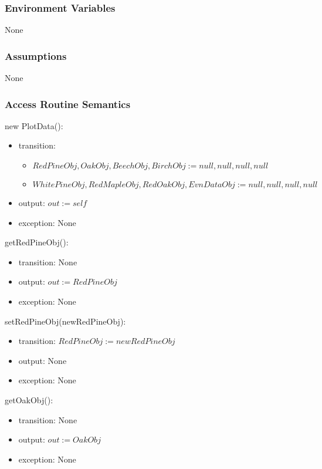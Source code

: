 \documentclass[12pt, titlepage]{article}
\begin{document}
\subsubsection{Environment Variables}
None

\subsubsection{Assumptions}
None

\subsubsection{Access Routine Semantics}

\noindent new PlotData():
\begin{itemize}
\item transition: 
\begin{itemize}
\item $\mathit{RedPineObj, OakObj, BeechObj, 
BirchObj := null, null, null, null}$

\item $\mathit{WhitePineObj, RedMapleObj, RedOakObj, EvnDataObj
:= null, null, null, null}$
\end{itemize}

\item output: $\mathit{out := self}$
\item exception: None 
\end{itemize}


\renewcommand{\attr}{RedPineObj}
\noindent get\attr():
\begin{itemize}
\item transition: None
\item output: $\mathit{out := \attr}$
\item exception: None
\end{itemize}

\noindent set\attr(new\attr):
\begin{itemize}
\item transition: $\mathit{\attr := new\attr}$
\item output: None
\item exception: None
\end{itemize}


\renewcommand{\attr}{OakObj}
\noindent get\attr():
\begin{itemize}
\item transition: None
\item output: $\mathit{out := \attr}$
\item exception: None
\end{itemize}
\end{document}
